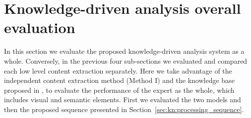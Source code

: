 





\section{Knowledge-driven analysis overall evaluation} %
\label{sub:ex:knowledge_driven_analysis_evaluation}

In this section we evaluate the proposed knowledge-driven analysis system as a whole.
Conversely, in the previous four sub-sections we evaluated and compared each low level content extraction separately.
Here we take advantage of the independent content extraction method (Method I) and the knowledge base proposed in , to evaluate the performance of the expert as the whole, which includes visual and semantic elements.
First we evaluated the two models and then the proposed sequence presented in Section~\ref{sec:kn:processing_sequence}.


